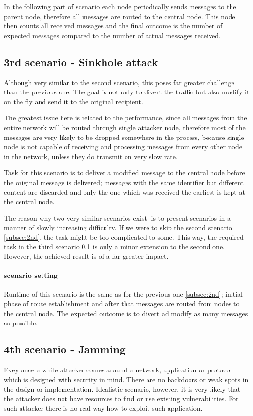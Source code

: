 \documentclass[
  print, %
  Table,   %
  nolof,     %
  nolot,     %
           oneside
]{fithesis3}
\begin{document}
    In the following part of scenario each node periodically sends messages to the parent node, therefore all messages are routed to the central node. This node then counts all received messages and the final outcome is the number of expected messages compared to the number of actual messages received.

    \subsection{3rd scenario - Sinkhole attack}\label{subsec:3rd}
    Although very similar to the second scenario, this poses far greater challenge than the previous one. The goal is not only to divert the traffic but also modify it on the fly and send it to the original recipient.

    The greatest issue here is related to the performance, since all messages from the entire network will be routed through single attacker node, therefore most of the messages are very likely to be dropped somewhere in the process, because single node is not capable of receiving and processing messages from every other node in the network, unless they do transmit on very slow rate.

    Task for this scenario is to deliver a modified message to the central node before the original message is delivered; messages with the same identifier but different content are discarded and only the one which was received the earliest is kept at the central node.

    The reason why two very similar scenarios exist, is to present scenarios in a manner of slowly increasing difficulty. If we were to skip the second scenario \ref{subsec:2nd}, the task might be too complicated to some. This way, the required task in the third scenario \ref{subsec:3rd} is only a minor extension to the second one. However, the achieved result is of a far greater impact.

    \paragraph{scenario setting}
    Runtime of this scenario is the same as for the previous one \ref{subsec:2nd}; initial phase of route establishment and after that messages are routed from nodes to the central node. The expected outcome is to divert ad modify as many messages as possible.

    \subsection{4th scenario - Jamming} \label{subsec:4th}
    Evey once a while attacker comes around a network, application or protocol which is designed with security in mind. There are no backdoors or weak spots in the design or implementation. Idealistic scenario, however, it is very likely that the attacker does not have resources to find or use existing vulnerabilities. For such attacker there is no real way how to exploit such application.
\end{document}
